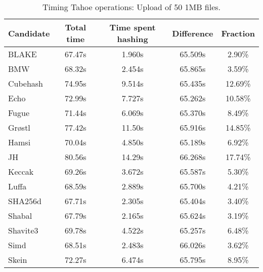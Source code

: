\begin{table}[h]
  \centering
  \begin{tabular}{ | l | c | c | c | c | }
    \hline
    Candidate & Total time & Time spent hashing & Difference & Fraction \\ \hline
    BLAKE     &  67.47s  &  1.960s  &  65.509s  &  2.90\%   \\  \hline
    BMW       &  68.32s  &  2.454s  &  65.865s  &  3.59\%   \\  \hline
    Cubehash  &  74.95s  &  9.514s  &  65.435s  &  12.69\%  \\  \hline
    Echo      &  72.99s  &  7.727s  &  65.262s  &  10.58\%  \\  \hline
    Fugue     &  71.44s  &  6.069s  &  65.370s  &  8.49\%   \\  \hline
    Grøstl    &  77.42s  &  11.50s  &  65.916s  &  14.85\%  \\  \hline
    Hamsi     &  70.04s  &  4.850s  &  65.189s  &  6.92\%   \\  \hline
    JH        &  80.56s  &  14.29s  &  66.268s  &  17.74\%  \\  \hline
    Keccak    &  69.26s  &  3.672s  &  65.587s  &  5.30\%   \\  \hline
    Luffa     &  68.59s  &  2.889s  &  65.700s  &  4.21\%   \\  \hline
    SHA256d   &  67.71s  &  2.305s  &  65.404s  &  3.40\%   \\  \hline
    Shabal    &  67.79s  &  2.165s  &  65.624s  &  3.19\%   \\  \hline
    Shavite3  &  69.78s  &  4.522s  &  65.257s  &  6.48\%   \\  \hline
    Simd      &  68.51s  &  2.483s  &  66.026s  &  3.62\%   \\  \hline
    Skein     &  72.27s  &  6.474s  &  65.795s  &  8.95\%   \\  \hline
  \end{tabular}
  \caption{Timing Tahoe operations: Upload of 50 1MB files.}
  \label{tbl:hashingtimes:put1mb}
\end{table}

